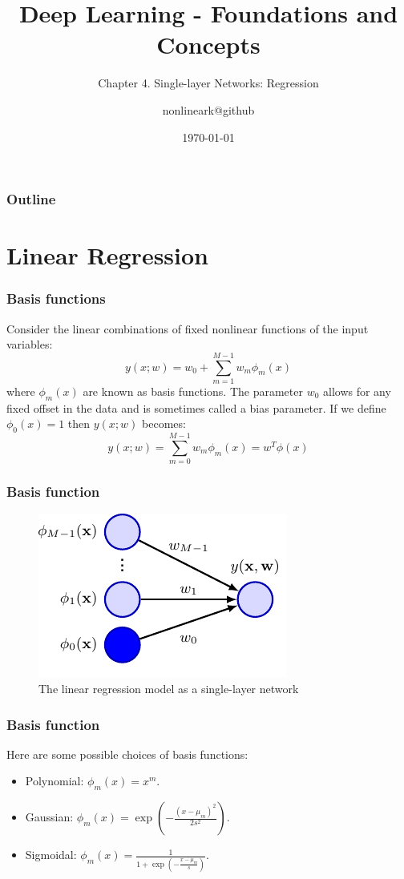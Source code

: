 \documentclass{beamer}
\title{Deep Learning - Foundations and Concepts}
\subtitle{Chapter 4. Single-layer Networks: Regression}
\author{nonlineark@github}
\date{\today}
\begin{document}
\begin{frame}
    \titlepage
\end{frame}

\begin{frame}
    \frametitle{Outline}
    \tableofcontents
\end{frame}

\section{Linear Regression}

\begin{frame}
    \frametitle{Basis functions}
    Consider the linear combinations of fixed nonlinear functions of the input variables:
    \begin{equation*}
        y(x;w)=w_{0}+\sum_{m=1}^{M-1}w_{m}\phi_{m}(x)
    \end{equation*}
    where $\phi_{m}(x)$ are known as basis functions. The parameter $w_{0}$ allows for any fixed offset in the data and is sometimes called a bias parameter. If we define $\phi_{0}(x)=1$ then $y(x;w)$ becomes:
    \begin{equation*}
        y(x;w)=\sum_{m=0}^{M-1}w_{m}\phi_{m}(x)=w^{T}\phi(x)
    \end{equation*}
\end{frame}

\begin{frame}
    \frametitle{Basis function}
    \begin{figure}
        \caption{The linear regression model as a single-layer network}
        \includegraphics{Figure_1.pdf}
    \end{figure}
\end{frame}

\begin{frame}
    \frametitle{Basis function}
    Here are some possible choices of basis functions:
    \begin{itemize}
        \item Polynomial: $\phi_{m}(x)=x^{m}$.
        \item Gaussian: $\phi_{m}(x)=\exp(-\frac{(x-\mu_{m})^{2}}{2s^{2}})$.
        \item Sigmoidal: $\phi_{m}(x)=\frac{1}{1+\exp(-\frac{x-\mu_{m}}{s})}$.
    \end{itemize}
\end{frame}
\end{document}
